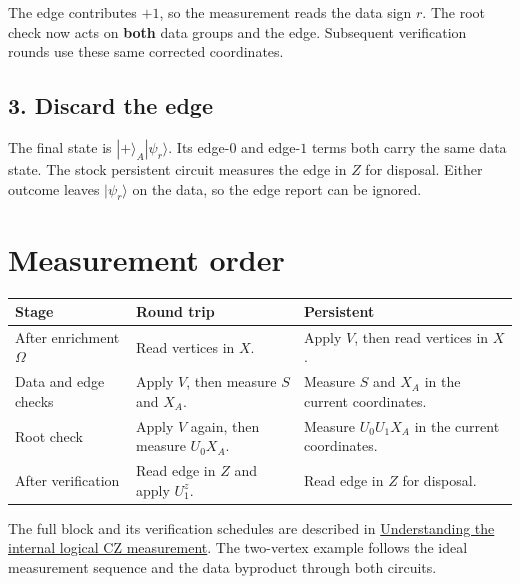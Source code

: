 \documentclass[11pt,a4paper]{article}
\begin{document}
The edge contributes \(+1\), so the measurement reads the data sign
\(r\). The root check now acts on \textbf{both} data groups and the edge.
Subsequent verification rounds use these same corrected coordinates.

\subsection*{3. Discard the edge}

The final state is \(|+\rangle_A|\psi_r\rangle\). Its edge-\(0\) and
edge-\(1\) terms both carry the same data state. The stock persistent
circuit measures the edge in \(Z\) for disposal. Either outcome leaves
\(|\psi_r\rangle\) on the data, so the edge report can be ignored.

\section*{Measurement order}

\begin{tabularx}{\textwidth}{@{}l>{\raggedright\arraybackslash}X>{\raggedright\arraybackslash}X@{}}
\toprule
\textbf{Stage} & \textbf{Round trip} & \textbf{Persistent} \\
\midrule
After enrichment \(\Omega\) & Read vertices in \(X\). & Apply \(V\), then read vertices in \(X\). \\
Data and edge checks & Apply \(V\), then measure \(S\) and \(X_A\). & Measure \(S\) and \(X_A\) in the current coordinates. \\
Root check & Apply \(V\) again, then measure \(U_0X_A\). & Measure \(U_0U_1X_A\) in the current coordinates. \\
After verification & Read edge in \(Z\) and apply \(U_1^z\). & Read edge in \(Z\) for disposal. \\
\bottomrule
\end{tabularx}

The full block and its verification schedules are described in
\href{run:Understandable_Inter_CZ.md}{Understanding the internal logical CZ measurement}.
The two-vertex example follows the ideal measurement sequence and the
data byproduct through both circuits.
\end{document}
